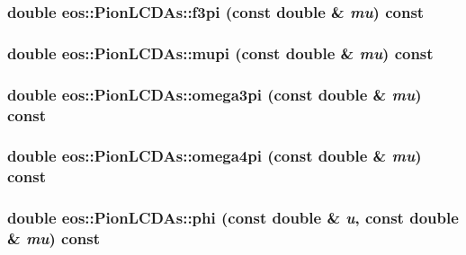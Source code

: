 \label{classeos_1_1PionLCDAs_a571ec82df903c4690aa2464a4ddd23a8}
\hypertarget{classeos_1_1PionLCDAs_af557dad976202ea84cd889721b080fb9}{
\subsubsection[{f3pi}]{\setlength{\rightskip}{0pt plus 5cm}double eos::PionLCDAs::f3pi (const double \& {\em mu}) const}}
\label{classeos_1_1PionLCDAs_af557dad976202ea84cd889721b080fb9}
\hypertarget{classeos_1_1PionLCDAs_ad9453233816c40f020512b302e37b7ab}{
\subsubsection[{mupi}]{\setlength{\rightskip}{0pt plus 5cm}double eos::PionLCDAs::mupi (const double \& {\em mu}) const}}
\label{classeos_1_1PionLCDAs_ad9453233816c40f020512b302e37b7ab}
\hypertarget{classeos_1_1PionLCDAs_ab821dbbf52dd22ff63c08ecda4000366}{
\subsubsection[{omega3pi}]{\setlength{\rightskip}{0pt plus 5cm}double eos::PionLCDAs::omega3pi (const double \& {\em mu}) const}}
\label{classeos_1_1PionLCDAs_ab821dbbf52dd22ff63c08ecda4000366}
\hypertarget{classeos_1_1PionLCDAs_a999a73d4b408e5b36a1ff7cd5c86c24a}{
\subsubsection[{omega4pi}]{\setlength{\rightskip}{0pt plus 5cm}double eos::PionLCDAs::omega4pi (const double \& {\em mu}) const}}
\label{classeos_1_1PionLCDAs_a999a73d4b408e5b36a1ff7cd5c86c24a}
\hypertarget{classeos_1_1PionLCDAs_a25af0e77528227031bdba7c630246c3a}{
\subsubsection[{phi}]{\setlength{\rightskip}{0pt plus 5cm}double eos::PionLCDAs::phi (const double \& {\em u}, \/  const double \& {\em mu}) const}}
